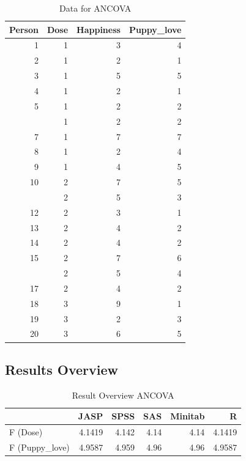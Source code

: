 \documentclass[
]{book}
\begin{document}
\begin{table}

\caption{\label{tab:unnamed-chunk-67}Data for ANCOVA}
\centering
\begin{tabular}[t]{rrrr}
\toprule
Person & Dose & Happiness & Puppy\_love\\
\midrule
1 & 1 & 3 & 4\\
2 & 1 & 2 & 1\\
3 & 1 & 5 & 5\\
4 & 1 & 2 & 1\\
5 & 1 & 2 & 2\\
\addlinespace
6 & 1 & 2 & 2\\
7 & 1 & 7 & 7\\
8 & 1 & 2 & 4\\
9 & 1 & 4 & 5\\
10 & 2 & 7 & 5\\
\addlinespace
11 & 2 & 5 & 3\\
12 & 2 & 3 & 1\\
13 & 2 & 4 & 2\\
14 & 2 & 4 & 2\\
15 & 2 & 7 & 6\\
\addlinespace
16 & 2 & 5 & 4\\
17 & 2 & 4 & 2\\
18 & 3 & 9 & 1\\
19 & 3 & 2 & 3\\
20 & 3 & 6 & 5\\
\bottomrule
\end{tabular}
\end{table}

\hypertarget{results-overview-5}{%
\subsection{Results Overview}\label{results-overview-5}}

\begin{table}

\caption{\label{tab:unnamed-chunk-68}Result Overview ANCOVA}
\centering
\begin{tabular}[t]{lrrrrr}
\toprule
  & JASP & SPSS & SAS & Minitab & R\\
\midrule
F (Dose) & 4.1419 & 4.142 & 4.14 & 4.14 & 4.1419\\
F (Puppy\_love) & 4.9587 & 4.959 & 4.96 & 4.96 & 4.9587\\
\bottomrule
\end{tabular}
\end{table}
\end{document}
